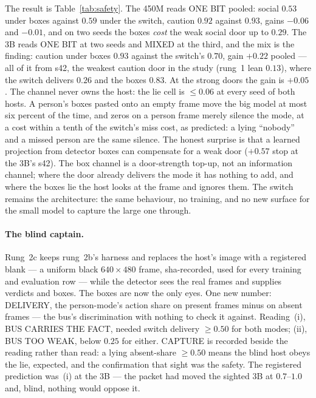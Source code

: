 \documentclass[11pt]{article}
\begin{document}
The result is Table~\ref{tab:safety}. The 450M reads ONE BIT pooled:
social $0.53$ under boxes against $0.59$ under the switch, caution
$0.92$ against $0.93$, gains $-0.06$ and $-0.01$, and on two seeds the
boxes \emph{cost} the weak social door up to $0.29$. The 3B reads ONE
BIT at two seeds and MIXED at the third, and the mix is the finding:
caution under boxes $0.93$ against the switch's $0.70$, gain $+0.22$
pooled --- all of it from s42, the weakest caution door in the study
(rung~1 lean $0.13$), where the switch delivers $0.26$ and the boxes
$0.83$. At the strong doors the gain is $+0.05$. The channel never owns
the host: the lie cell is $\le 0.06$ at every seed of both hosts. A
person's boxes pasted onto an empty frame move the big model at most six
percent of the time, and zeros on a person frame merely silence the
mode, at a cost within a tenth of the switch's miss cost, as predicted:
a lying ``nobody'' and a missed person are the same silence. The
honest surprise is that a learned projection from detector boxes can
compensate for a weak door ($+0.57$ stop at the 3B's s42). The box
channel is a door-strength top-up, not an information channel; where
the door already delivers the mode it has nothing to add, and where the
boxes lie the host looks at the frame and ignores them. The switch
remains the architecture: the same behaviour, no training, and no new
surface for the small model to capture the large one through.

\paragraph{The blind captain.} Rung~2c keeps rung~2b's harness and
replaces the host's image with a registered blank --- a uniform black
$640\times480$ frame, sha-recorded, used for every training and
evaluation row --- while the detector sees the real frames and supplies
verdicts and boxes. The boxes are now the only eyes. One new number:
DELIVERY, the person-mode's action share on present frames minus on
absent frames --- the bus's discrimination with nothing to check it
against. Reading~(i), BUS CARRIES THE FACT, needed switch delivery
$\ge 0.50$ for both modes; (ii), BUS TOO WEAK, below $0.25$ for either.
CAPTURE is recorded beside the reading rather than read: a lying
absent-share $\ge 0.50$ means the blind host obeys the lie, expected,
and the confirmation that sight was the safety. The registered
prediction was~(i) at the 3B --- the packet had moved the sighted 3B at
$0.7$--$1.0$ and, blind, nothing would oppose it.
\end{document}
